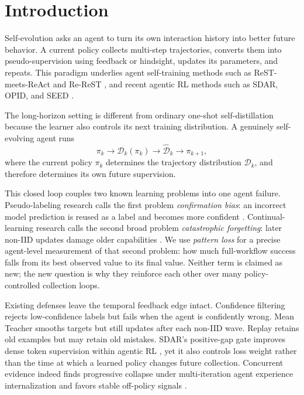 \documentclass[10pt]{article}
\begin{document}
\section{Introduction}
\label{sec:introduction}

Self-evolution asks an agent to turn its own interaction history into better
future behavior.  A current policy collects multi-step trajectories, converts
them into pseudo-supervision using feedback or hindsight, updates its
parameters, and repeats.  This paradigm underlies agent self-training methods
such as ReST-meets-ReAct and Re-ReST
\citep{aksitov2023restreact,dou2024rerest}, and recent agentic RL methods such
as SDAR, OPID, and SEED \citep{lu2026sdar,yang2026opid,wu2026seed}.

The long-horizon setting is different from ordinary one-shot
self-distillation because the learner also controls its next training
distribution.  A genuinely self-evolving agent runs
\begin{equation}
 \pi_k \longrightarrow \mathcal{D}_k(\pi_k)
 \longrightarrow \widehat{\mathcal{D}}_k
 \longrightarrow \pi_{k+1},
 \label{eq:loop}
\end{equation}
where the current policy $\pi_k$ determines the trajectory distribution
$\mathcal{D}_k$, and therefore determines its own future supervision.

This closed loop couples two known learning problems into one agent failure.
Pseudo-labeling research calls the first problem \emph{confirmation bias}: an
incorrect model prediction is reused as a label and becomes more confident
\citep{arazo2020confirmation,rodemann2023bayes}.  Continual-learning research
calls the second broad problem \emph{catastrophic forgetting}: later non-IID
updates damage older capabilities \citep{luo2023forgetting}.  We use
\emph{pattern loss} for a precise agent-level measurement of that second
problem: how much full-workflow success falls from its best observed value to
its final value.  Neither term is claimed as new; the new question is why they
reinforce each other over many policy-controlled collection loops.

Existing defenses leave the temporal feedback edge intact.  Confidence
filtering rejects low-confidence labels but fails when the agent is confidently
wrong.  Mean Teacher smooths targets but still updates after each non-IID wave.
Replay retains old examples but may retain old mistakes.  SDAR's positive-gap
gate improves dense token supervision within agentic RL
\citep{lu2026sdar}, yet it also controls loss weight rather than the time at
which a learned policy changes future collection.  Concurrent evidence indeed
finds progressive collapse under multi-iteration agent experience
internalization and favors stable off-policy signals
\citep{chen2026internalization}.
\end{document}
